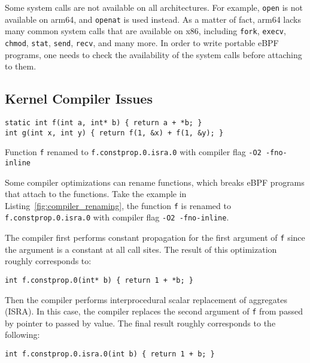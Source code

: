 Some system calls are not available on all architectures.
For example, \texttt{open} is not available on arm64, and \texttt{openat} is used instead.
As a matter of fact, arm64 lacks many common system calls that are available on x86, including \texttt{fork}, \texttt{execv}, \texttt{chmod}, \texttt{stat}, \texttt{send}, \texttt{recv}, and many more.
In order to write portable eBPF programs, one needs to check the availability of the system calls before attaching to them.




\subsection{Kernel Compiler Issues}

\begin{listing}[t]
  \begin{verbatim}
static int f(int a, int* b) { return a + *b; }
int g(int x, int y) { return f(1, &x) + f(1, &y); }
\end{verbatim}
  \caption{Function \texttt{f} renamed to \texttt{f.constprop.0.isra.0} with compiler flag \texttt{-O2 -fno-inline}}
  \label{fig:compiler_renaming}
\end{listing}



Some compiler optimizations can rename functions, which breaks eBPF programs that attach to the functions.
Take the example in Listing~\ref{fig:compiler_renaming}, the function \texttt{f} is renamed to \texttt{f.constprop.0.isra.0} with compiler flag \texttt{-O2 -fno-inline}.

The compiler first performs constant propagation for the first argument of \texttt{f} since the argument is a constant at all call sites.
The result of this optimization roughly corresponds to:
\begin{verbatim}
int f.constprop.0(int* b) { return 1 + *b; }
\end{verbatim}

Then the compiler performs interprocedural scalar replacement of aggregates (ISRA).
In this case, the compiler replaces the second argument of \texttt{f} from passed by pointer to passed by value.
The final result roughly corresponds to the following:
\begin{verbatim}
int f.constprop.0.isra.0(int b) { return 1 + b; }
\end{verbatim}

